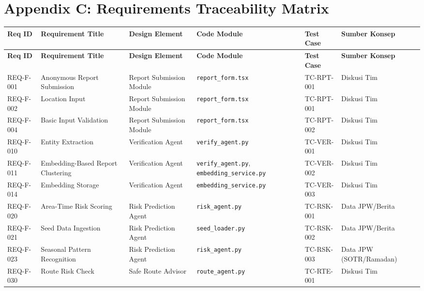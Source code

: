\documentclass[11pt,a4paper]{article}
\begin{document}
\newpage

\section*{Appendix C: Requirements Traceability Matrix}
\footnotesize
\begin{longtable}{|L{1.7cm}|L{2.6cm}|L{2.3cm}|L{2.6cm}|L{1.7cm}|L{2.0cm}|}
\hline
{}\textbf{Req ID} & \textbf{Requirement Title} & \textbf{Design Element} & \textbf{Code Module} & \textbf{Test Case} & \textbf{Sumber Konsep} \\ \hline
\endfirsthead
\hline
{}\textbf{Req ID} & \textbf{Requirement Title} & \textbf{Design Element} & \textbf{Code Module} & \textbf{Test Case} & \textbf{Sumber Konsep} \\ \hline
\endhead
REQ-F-001 & Anonymous Report Submission & Report Submission Module & \texttt{report\_form.tsx} & TC-RPT-001 & Diskusi Tim \\ \hline
REQ-F-002 & Location Input & Report Submission Module & \texttt{report\_form.tsx} & TC-RPT-001 & Diskusi Tim \\ \hline
REQ-F-004 & Basic Input Validation & Report Submission Module & \texttt{report\_form.tsx} & TC-RPT-002 & Diskusi Tim \\ \hline
REQ-F-010 & Entity Extraction & Verification Agent & \texttt{verify\_agent.py} & TC-VER-001 & Diskusi Tim \\ \hline
REQ-F-011 & Embedding-Based Report Clustering & Verification Agent & \texttt{verify\_agent.py}, \texttt{embedding\_service.py} & TC-VER-002 & Diskusi Tim \\ \hline
REQ-F-014 & Embedding Storage & Verification Agent & \texttt{embedding\_service.py} & TC-VER-003 & Diskusi Tim \\ \hline
REQ-F-020 & Area-Time Risk Scoring & Risk Prediction Agent & \texttt{risk\_agent.py} & TC-RSK-001 & Data JPW/Berita \\ \hline
REQ-F-021 & Seed Data Ingestion & Risk Prediction Agent & \texttt{seed\_loader.py} & TC-RSK-002 & Data JPW/Berita \\ \hline
REQ-F-023 & Seasonal Pattern Recognition & Risk Prediction Agent & \texttt{risk\_agent.py} & TC-RSK-003 & Data JPW (SOTR/Ramadan) \\ \hline
REQ-F-030 & Route Risk Check & Safe Route Advisor & \texttt{route\_agent.py} & TC-RTE-001 & Diskusi Tim \\ \hline

\end{longtable}
\end{document}
